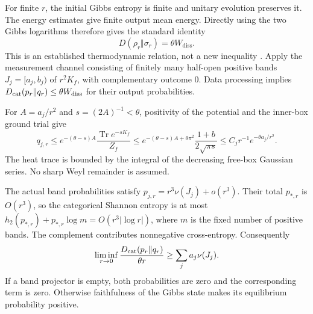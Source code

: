 \documentclass[aps,prl,reprint,superscriptaddress,longbibliography]{revtex4-2}
\newcommand{\Tr}{\operatorname{Tr}}
\newcommand{\Wd}{W_{\mathrm{diss}}}
\begin{document}
For finite $r$, the initial Gibbs entropy is finite and unitary evolution preserves it. The energy estimates give finite output mean energy. Directly using the two Gibbs logarithms therefore gives the standard identity
\begin{equation}
 D(\rho_r\Vert\sigma_r)=\theta\Wd.\label{th:gibbs}
\end{equation}
This is an established thermodynamic relation, not a new inequality \cite{Deffner}. Apply the measurement channel consisting of finitely many half-open positive bands $J_j=[a_j,b_j)$ of $r^2K_f$, with complementary outcome $0$. Data processing \cite{Lindblad} implies $D_{\rm cat}(p_r\Vert q_r)\le\theta\Wd$ for their output probabilities.

For $A=a_j/r^2$ and $s=(2A)^{-1}<\theta$, positivity of the potential and the inner-box ground trial give
\begin{equation}
 q_{j,r}\le e^{-(\theta-s)A}\frac{\Tr e^{-sK_f}}{Z_f}
 \le e^{-(\theta-s)A+\theta\pi^2}\frac{1+b}{2\sqrt{\pi s}}
 \le C_j r^{-1}e^{-\theta a_j/r^2}.\label{th:eqtail}
\end{equation}
The heat trace is bounded by the integral of the decreasing free-box Gaussian series. No sharp Weyl remainder is assumed.

The actual band probabilities satisfy $p_{j,r}=r^3\nu(J_j)+o(r^3)$. Their total $p_{*,r}$ is $O(r^3)$, so the categorical Shannon entropy is at most $h_2(p_{*,r})+p_{*,r}\log m=O(r^3|\log r|)$, where $m$ is the fixed number of positive bands. The complement contributes nonnegative cross-entropy. Consequently
\begin{equation}
 \liminf_{r\to0}\frac{D_{\rm cat}(p_r\Vert q_r)}{\theta r}
 \ge\sum_ja_j\nu(J_j).\label{th:lowerentropy}
\end{equation}
If a band projector is empty, both probabilities are zero and the corresponding term is zero. Otherwise faithfulness of the Gibbs state makes its equilibrium probability positive.
\end{document}
